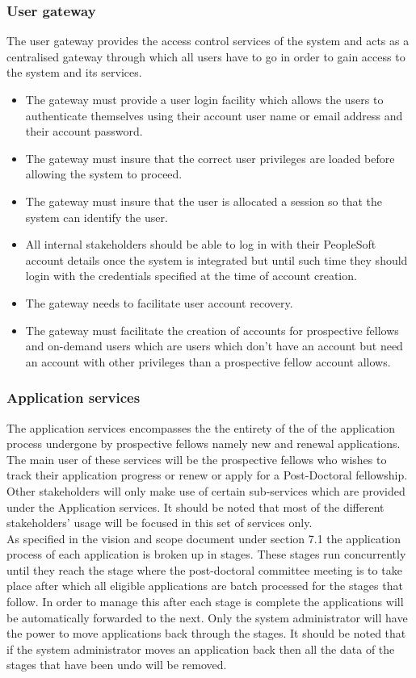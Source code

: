 \documentclass[12pt]{article}
\begin{document}
\subsubsection{User gateway}
	The user gateway provides the access control services of the system and acts as a centralised gateway through which all users have to go in order to gain access to the system and its services. 
	\begin{itemize}
		\item The gateway must provide a user login facility which allows the users to authenticate themselves using their account user name or email address and their account password.
		\item The gateway must insure that the correct user privileges are loaded before allowing the system to proceed.
		\item The gateway must insure that the user is allocated a session so that the system can identify the user.
		\item All internal stakeholders should be able to log in with their PeopleSoft account details once the system is integrated but until such time they should login with the credentials specified at the time of account creation. 
		\item The gateway needs to facilitate user account recovery.
		\item The gateway must facilitate the creation of accounts for prospective fellows and on-demand users which are users which don't have an account but need an account with other privileges than a prospective fellow account allows. 
	\end{itemize}

\subsubsection{Application services}
	The application services encompasses the the entirety of the of the application process undergone by prospective fellows namely new and renewal applications.\\
	The main user of these services will be the prospective fellows who wishes to track their application progress or renew or apply for a Post-Doctoral fellowship. Other stakeholders will only make use of certain sub-services which are provided under the Application services. It should be noted that most of the different stakeholders' usage will be focused in this set of services only. \\As specified in the vision and scope document under section 7.1 the application process of each application is broken up in stages. These stages run concurrently until they reach the stage where the post-doctoral committee meeting is to take place after which all eligible applications are batch processed for the stages that follow. In order to manage this after each stage is complete the applications will be automatically forwarded to the next. Only the system administrator will have the power to move applications back through the stages. It should be noted that if the system administrator moves an application back then all the data of the stages that have been undo will be removed.
	
\end{document}
